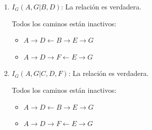 \documentclass[12pt,a4paper]{article}
\begin{document}
\begin{enumerate}
\begin{enumerate}
        Todos los caminos están inactivos:
        \begin{multicols}{2}
            \begin{itemize}
                \item $C \to E \to F$
                \item $C \to E \leftarrow B \to D \to F$
            \end{itemize}
        \end{multicols}
        
        \item $I_G(A, G | B, D)$: \; La relación es verdadera.
        
        Todos los caminos están inactivos:
        \begin{multicols}{2}
            \begin{itemize}
                \item $A \to D \leftarrow B \to E \to G$
                \item $A \to D \to F \leftarrow E \to G$
            \end{itemize}
        \end{multicols}

        \item $I_G(A, G | C, D, F)$: \; La relación es verdadera.
        
        Todos los caminos están inactivos:
        \begin{multicols}{2}
            \begin{itemize}
                \item $A \to D \leftarrow B \to E \to G$
                \item $A \to D \to F \leftarrow E \to G$
            \end{itemize}
        \end{multicols}
        
    \end{enumerate}
\end{enumerate}

\newpage
\end{document}
